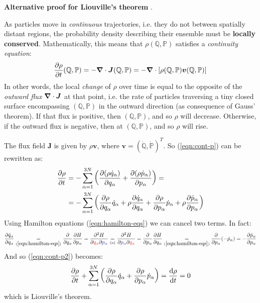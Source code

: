 \documentclass[../template.tex]{subfiles}
\begin{document}
\begin{appr}\textbf{Alternative proof for Liouville's theorem} \cite[Chapter~4.1]{sethna}. 

    \medskip

    As particles move in \textit{continuous} trajectories, i.e. they do not  between spatially distant regions, the probability density describing their ensemble must be \textbf{locally conserved}. Mathematically, this means that $\rho(\mathbb{Q}, \mathbb{P})$ satisfies a \textit{continuity equation}:
    \begin{align} \label{eqn:cont-p}
        {\pdv{\rho}{t}} (\mathbb{Q}, \mathbb{P}) = - \grad \cdot \bm{J} (\mathbb{Q}, \mathbb{P}) = - \grad \cdot  [\rho(\mathbb{Q}, \mathbb{P}) \bm{v} (\mathbb{Q},\mathbb{P})]
    \end{align}   
    In other words, the local \textit{change} of $\rho$ over time is equal to the opposite of the \textit{outward flux} $\grad \cdot \bm{J}$ at that point, i.e. the rate of particles traversing a tiny closed surface encompassing $(\mathbb{Q}, \mathbb{P})$ in the outward direction (as consequence of Gauss' theorem). If that flux is positive, then  $(\mathbb{Q}, \mathbb{P})$, and so $\rho$ will decrease. Otherwise, if the outward flux is negative, then  at $(\mathbb{Q}, \mathbb{P})$, and so $\rho$ will rise.

    \medskip

    The flux field $\bm{J}$ is given by $\rho \bm{v}$, where $\bm{v} = (\dot{\mathbb{Q}}, \dot{\mathbb{P}})^T$. So (\ref{eqn:cont-p}) can be rewritten as:
    \begin{align}\nonumber
        \pdv{\rho}{t} &= - \sum_{\alpha=1}^{3N} \left(\pdv{(\rho \dot{q}_\alpha)}{q_\alpha} + \pdv{(\rho \dot{p}_\alpha)}{p_\alpha}\right) = \\
        &= - \sum_{\alpha=1}^{3N} \left(\pdv{\rho}{q_\alpha} \dot{q}_\alpha + \rho \pdv{\dot{q}_\alpha}{q_\alpha}  + \pdv{\rho}{p_\alpha} \dot{p}_\alpha + \rho \pdv{\dot{p}_\alpha}{p_\alpha}\right) \label{eqn:cont-p2}
    \end{align}
    Using Hamilton equations (\ref{eqn:hamilton-eqs}) we can cancel two terms. In fact:
    \begin{align*}
        \pdv{\dot{q}_\alpha}{q_\alpha} \underset{(\ref{eqn:hamilton-eqs})}{=} \pdv{q_\alpha} \pdv{H}{p_\alpha} = \pdv[2]{H}{\textcolor{Red}{q_\alpha}}{\textcolor{Blue}{p_\alpha}} \underset{(a)}{=} \pdv[2]{H}{\textcolor{Blue}{p_\alpha}}{\textcolor{Red}{q_\alpha}} = \pdv{p_\alpha} \pdv{H}{q_\alpha} \underset{(\ref{eqn:hamilton-eqs})}{=} \pdv{p_\alpha} (-\dot{p}_\alpha) = - \pdv{\dot{p}_\alpha}{p_\alpha}
    \end{align*}
    And so (\ref{eqn:cont-p2}) becomes:
    \begin{align*}
        \pdv{\rho}{t} + \sum_{\alpha=1}^{3N} \left( \pdv{\rho}{q_\alpha} \dot{q}_\alpha + \pdv{\rho}{p_\alpha} \dot{p}_\alpha\right) = \dv{\rho}{t} = 0
    \end{align*}
    which is Liouville's theorem.
\end{appr}
\end{document}
